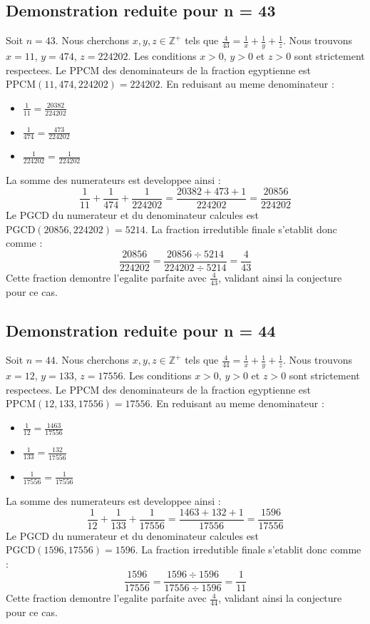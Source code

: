 \documentclass[11pt,a4paper]{article}
\begin{document}
\subsection{Demonstration reduite pour n = 43}
Soit $n = 43$. Nous cherchons $x, y, z \in \mathbb{Z}^{+}$ tels que $\frac{4}{43} = \frac{1}{x} + \frac{1}{y} + \frac{1}{z}$.
Nous trouvons $x = 11$, $y = 474$, $z = 224202$.
Les conditions $x > 0$, $y > 0$ et $z > 0$ sont strictement respectees.
Le PPCM des denominateurs de la fraction egyptienne est $\text{PPCM}(11, 474, 224202) = 224202$.
En reduisant au meme denominateur :
\begin{itemize}
    \item $\frac{1}{11} = \frac{20382}{224202}$
    \item $\frac{1}{474} = \frac{473}{224202}$
    \item $\frac{1}{224202} = \frac{1}{224202}$
\end{itemize}
La somme des numerateurs est developpee ainsi :
$$ \frac{1}{11} + \frac{1}{474} + \frac{1}{224202} = \frac{20382 + 473 + 1}{224202} = \frac{20856}{224202} $$
Le PGCD du numerateur et du denominateur calcules est $\text{PGCD}(20856, 224202) = 5214$.
La fraction irredutible finale s'etablit donc comme :
$$ \frac{20856}{224202} = \frac{20856 \div 5214}{224202 \div 5214} = \frac{4}{43} $$
Cette fraction demontre l'egalite parfaite avec $\frac{4}{43}$, validant ainsi la conjecture pour ce cas.

\subsection{Demonstration reduite pour n = 44}
Soit $n = 44$. Nous cherchons $x, y, z \in \mathbb{Z}^{+}$ tels que $\frac{4}{44} = \frac{1}{x} + \frac{1}{y} + \frac{1}{z}$.
Nous trouvons $x = 12$, $y = 133$, $z = 17556$.
Les conditions $x > 0$, $y > 0$ et $z > 0$ sont strictement respectees.
Le PPCM des denominateurs de la fraction egyptienne est $\text{PPCM}(12, 133, 17556) = 17556$.
En reduisant au meme denominateur :
\begin{itemize}
    \item $\frac{1}{12} = \frac{1463}{17556}$
    \item $\frac{1}{133} = \frac{132}{17556}$
    \item $\frac{1}{17556} = \frac{1}{17556}$
\end{itemize}
La somme des numerateurs est developpee ainsi :
$$ \frac{1}{12} + \frac{1}{133} + \frac{1}{17556} = \frac{1463 + 132 + 1}{17556} = \frac{1596}{17556} $$
Le PGCD du numerateur et du denominateur calcules est $\text{PGCD}(1596, 17556) = 1596$.
La fraction irredutible finale s'etablit donc comme :
$$ \frac{1596}{17556} = \frac{1596 \div 1596}{17556 \div 1596} = \frac{1}{11} $$
Cette fraction demontre l'egalite parfaite avec $\frac{4}{44}$, validant ainsi la conjecture pour ce cas.
\end{document}
